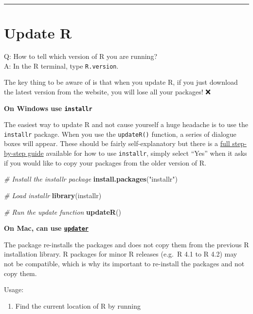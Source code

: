 \documentclass[
  a4paper,
  twoside,
  openright]{book}
\newenvironment{Shaded}{\begin{snugshade}}{\end{snugshade}}
\newcommand{\CommentTok}[1]{\textcolor[rgb]{0.56,0.35,0.01}{\textit{#1}}}
\newcommand{\FunctionTok}[1]{\textcolor[rgb]{0.13,0.29,0.53}{\textbf{#1}}}
\newcommand{\NormalTok}[1]{#1}
\newcommand{\StringTok}[1]{\textcolor[rgb]{0.31,0.60,0.02}{#1}}
\providecommand{\tightlist}{%
  \setlength{\itemsep}{0pt}\setlength{\parskip}{0pt}}
\theoremstyle{definition}
\theoremstyle{definition}
\theoremstyle{definition}
\theoremstyle{definition}
\theoremstyle{remark}
\begin{document}
\begin{center}\rule{0.5\linewidth}{0.5pt}\end{center}

\section{Update R}\label{update-r}

Q: How to tell which version of R you are running?\\
A: In the R terminal, type \texttt{R.version}.

The key thing to be aware of is that when you update R, {if you just download the latest version from the website, you will lose all your packages!} ❌

\textbf{On Windows use \texttt{installr}}

The easiest way to update R and not cause yourself a huge headache is to use the \texttt{installr} package. When you use the \texttt{updateR()} function, a series of dialogue boxes will appear. These should be fairly self-explanatory but there is a \href{https://www.r-statistics.com/2015/06/a-step-by-step-screenshots-tutorial-for-upgrading-r-on-windows/\#google_vignette}{full step-by-step guide} available for how to use \texttt{installr}, simply select ``Yes'' when it asks if you would like to copy your packages from the older version of R.

\begin{Shaded}
\begin{Highlighting}[]
\CommentTok{\# Install the installr package}
\FunctionTok{install.packages}\NormalTok{(}\StringTok{"installr"}\NormalTok{)}

\CommentTok{\# Load installr}
\FunctionTok{library}\NormalTok{(installr)}

\CommentTok{\# Run the update function}
\FunctionTok{updateR}\NormalTok{()}
\end{Highlighting}
\end{Shaded}

\textbf{On Mac, can use \href{https://rdrr.io/cran/updater/}{\texttt{updater}}}

The package re-installs the packages and does not copy them from the previous R installation library. R packages for minor R releases (e.g.~R 4.1 to R 4.2) may not be compatible, which is why its important to re-install the packages and not copy them.

Usage:

\begin{enumerate}
\def\labelenumi{\arabic{enumi}.}
\tightlist
\item
  Find the current location of R by running
\end{enumerate}
\end{document}
